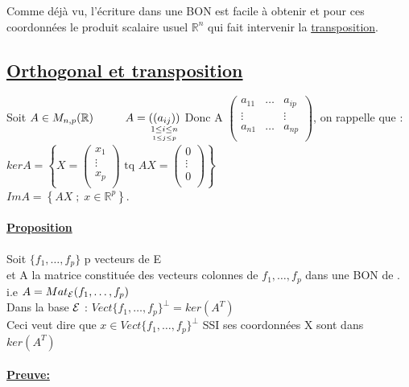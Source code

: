 \documentclass{article}
\newcommand\tab[1][1cm]{\hspace*{#1}}
\begin{document}
Comme déjà vu, l'écriture dans une BON est facile à obtenir et pour ces coordonnées le produit scalaire usuel $\mathbb{R}^n$ qui fait intervenir la \underline{transposition}.




\subsection{\underline{Orthogonal et transposition}}

Soit $A \in M_{n, p}(\mathbb{R}) \tab A = \underset{\underset{1 \leq j \leq p}{1 \leq i \leq n}}{((a_{ij}))}$
Donc A $\begin{pmatrix}
    a_{11} & \dots & a_{ip}\\
    \vdots & & \vdots\\
    a_{n1} & \dots & a_{np}\\
\end{pmatrix}$, on rappelle que :\\
$ker A = \left\{ X = \begin{pmatrix}
    x_1\\
    \vdots\\
    x_p\\
\end{pmatrix} \mbox{ tq } AX = \begin{pmatrix}
    0\\
    \vdots\\
    0\\
\end{pmatrix} \right\}$\\
$ImA = \left\{AX \;;\; x \in \mathbb{R}^p
\right\}$.
\paragraph{\underline{Proposition}} Soit $\{f_1, \dots, f_p\}$ p vecteurs de E\\
et A la matrice constituée des vecteurs colonnes de $f_1, \dots, f_p$ dans une BON de . i.e $A = Mat_{\cal{E}}(f_1, \dots, f_p)$\\
Dans la base $\cal{E}$ : $Vect\{f_1, \dots, f_p\}^\perp = ker(A^T)$\\

Ceci veut dire que $x \in Vect\{f_1, \dots, f_p\}^\perp$ SSI ses coordonnées X sont dans $ker(A^T)$

\paragraph{\underline{Preuve:}}
\end{document}
